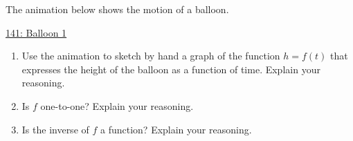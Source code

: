 \documentclass{ximera}
\begin{document}
\begin{exploration} \label{E2:Quadratics}
The animation below shows the motion of a balloon. 

 
\begin{onlineOnly}
    \begin{center}
\end{center}
\end{onlineOnly}

\href{https://www.desmos.com/calculator/95v58n7mti}{141: Balloon 1}

\begin{enumerate}

\item Use the animation to sketch by hand a graph of the function $h=f(t)$ that expresses the height of the balloon as a function of time. Explain your reasoning.

\item Is $f$ one-to-one? Explain your reasoning.

\item Is the inverse of $f$ a function? Explain your reasoning.

\end{enumerate}

\end{exploration}
\end{document}
